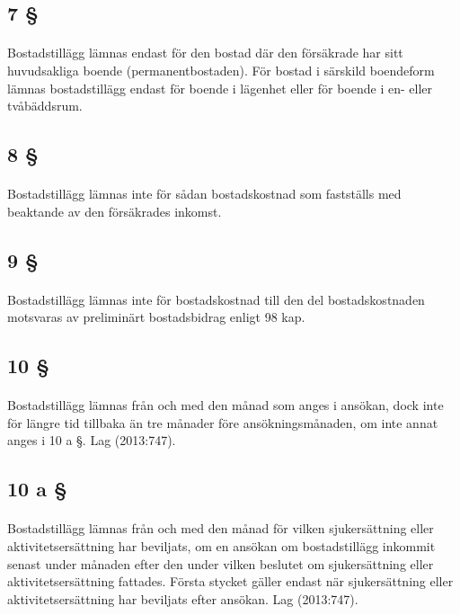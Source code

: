 \documentclass[a4paper,notitlepage,openany,10pt]{book}
\begin{document}
\subsection*{7 §}
\paragraph*{}
Bostadstillägg lämnas endast för den bostad där den försäkrade har sitt huvudsakliga boende (permanentbostaden).
För bostad i särskild boendeform lämnas bostadstillägg endast för boende i lägenhet eller för boende i en- eller tvåbäddsrum.
\subsection*{8 §}
\paragraph*{}
Bostadstillägg lämnas inte för sådan bostadskostnad som fastställs med beaktande av den försäkrades inkomst.
\subsection*{9 §}
\paragraph*{}
Bostadstillägg lämnas inte för bostadskostnad till den del bostadskostnaden motsvaras av preliminärt bostadsbidrag enligt 98 kap.
\subsection*{10 §}
\paragraph*{}
Bostadstillägg lämnas från och med den månad som anges i ansökan, dock inte för längre tid tillbaka än tre månader före ansökningsmånaden, om inte annat anges i 10 a §.
Lag (2013:747).
\subsection*{10 a §}
\paragraph*{}
Bostadstillägg lämnas från och med den månad för vilken sjukersättning eller aktivitetsersättning har beviljats, om en ansökan om bostadstillägg inkommit senast under månaden efter den under vilken beslutet om sjukersättning eller aktivitetsersättning fattades.
Första stycket gäller endast när sjukersättning eller aktivitetsersättning har beviljats efter ansökan.
Lag (2013:747).
\end{document}
